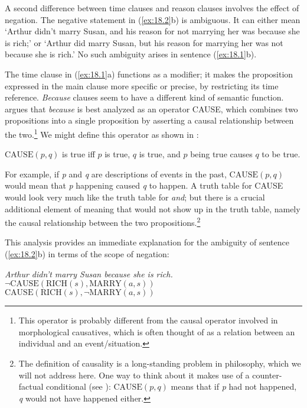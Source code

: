 A second difference between time clauses and reason clauses involves the effect of negation. The negative statement in (\ref{ex:18.2}b) is ambiguous. It can either mean ‘Arthur didn’t marry Susan, and his reason for not marrying her was because she is rich;’ or ‘Arthur did marry Susan, but his reason for marrying her was not because she is rich.’ No such ambiguity arises in sentence (\ref{ex:18.1}b).



The time clause in (\ref{ex:18.1}a) functions as a modifier; it makes the proposition expressed in the main clause more specific or precise, by restricting its time reference. \textit{Because} clauses seem to have a different kind of semantic function. \citet{Johnston1994} argues that \textit{because} is best analyzed as an operator CAUSE, which combines two propositions into a single proposition by asserting a causal relationship between the two.\footnote{This operator is probably different from the causal operator involved in morphological causatives, which is often thought of as a relation between an individual and an event/situation.} We might define this operator as shown in :


\ea \label{ex:18.4}
$\text{CAUSE}(p,q)$ is true iff $p$ is true, $q$ is true, and $p$ being true causes $q$ to be true.
\z


For example, if \textit{p} and \textit{q} are descriptions of events in the past, $\text{CAUSE}(p,q)$ would mean that \textit{p} happening caused \textit{q} to happen. A truth table for CAUSE would look very much like the truth table for \textit{and}; but there is a crucial additional element of meaning that would not show up in the truth table, namely the causal relationship between the two propositions.\footnote{The definition of causality is a long-standing problem in philosophy, which we will not address here. One way to think about it makes use of a counter-factual conditional (see ): $\text{CAUSE}(p,q)$ means that if \textit{p} had not happened, \textit{q} would not have happened either.}



This analysis provides an immediate explanation for the ambiguity of sentence (\ref{ex:18.2}b) in terms of the scope of negation:


\ea \label{ex:18.5}
  \textit{Arthur didn’t marry Susan because she is rich.}\\
\ea  $\neg\text{CAUSE}(\text{RICH}(s), \text{MARRY}(a,s))$\\
\ex  $ \text{CAUSE}(\text{RICH}(s), \neg\text{MARRY}(a,s))$
   \z
\z


